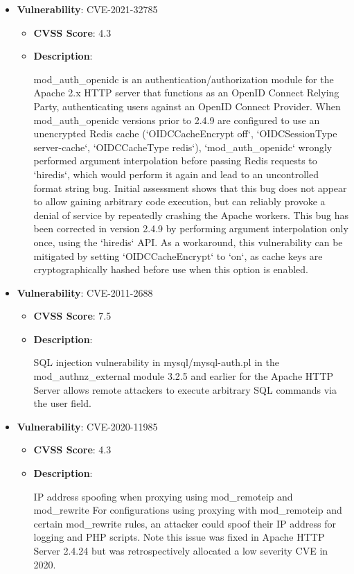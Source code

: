 \documentclass{article}
\begin{document}
\begin{itemize}
        \item \textbf{Vulnerability}: CVE-2021-32785
        \begin{itemize}
            \item \textbf{CVSS Score}:  4.3 
            \item \textbf{Description}:
            \parbox[t]{0.9\linewidth}{
                \ttfamily mod\_auth\_openidc is an authentication/authorization module for the Apache 2.x HTTP server that functions as an OpenID Connect Relying Party, authenticating users against an OpenID Connect Provider. When mod\_auth\_openidc versions prior to 2.4.9 are configured to use an unencrypted Redis cache (`OIDCCacheEncrypt off`, `OIDCSessionType server-cache`, `OIDCCacheType redis`), `mod\_auth\_openidc` wrongly performed argument interpolation before passing Redis requests to `hiredis`, which would perform it again and lead to an uncontrolled format string bug. Initial assessment shows that this bug does not appear to allow gaining arbitrary code execution, but can reliably provoke a denial of service by repeatedly crashing the Apache workers. This bug has been corrected in version 2.4.9 by performing argument interpolation only once, using the `hiredis` API. As a workaround, this vulnerability can be mitigated by setting `OIDCCacheEncrypt` to `on`, as cache keys are cryptographically hashed before use when this option is enabled.
            }
        \end{itemize}
    
        \item \textbf{Vulnerability}: CVE-2011-2688
        \begin{itemize}
            \item \textbf{CVSS Score}:  7.5 
            \item \textbf{Description}:
            \parbox[t]{0.9\linewidth}{
                \ttfamily SQL injection vulnerability in mysql/mysql-auth.pl in the mod\_authnz\_external module 3.2.5 and earlier for the Apache HTTP Server allows remote attackers to execute arbitrary SQL commands via the user field.
            }
        \end{itemize}
    
        \item \textbf{Vulnerability}: CVE-2020-11985
        \begin{itemize}
            \item \textbf{CVSS Score}:  4.3 
            \item \textbf{Description}:
            \parbox[t]{0.9\linewidth}{
                \ttfamily IP address spoofing when proxying using mod\_remoteip and mod\_rewrite For configurations using proxying with mod\_remoteip and certain mod\_rewrite rules, an attacker could spoof their IP address for logging and PHP scripts. Note this issue was fixed in Apache HTTP Server 2.4.24 but was retrospectively allocated a low severity CVE in 2020.
            }
        \end{itemize}
    

\end{itemize}
\end{document}
